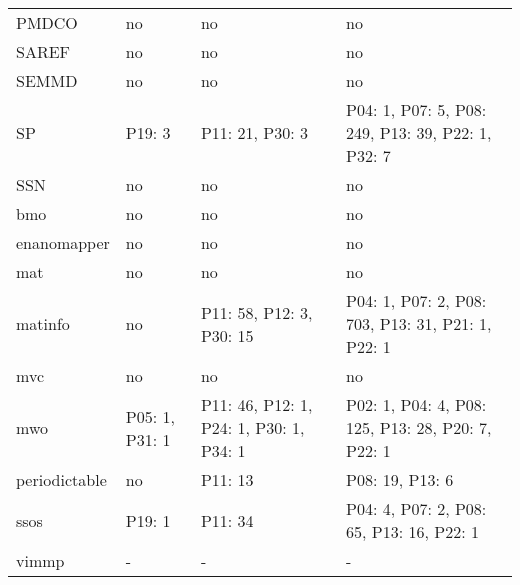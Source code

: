 \begin{tabular}{m{5cm}m{3cm}m{3cm}m{3cm}}
                  PMDCO &                      no &                                      no &                                                no \\
                  SAREF &                      no &                                      no &                                                no \\
                  SEMMD &                      no &                                      no &                                                no \\
                     SP &                  P19: 3 &                         P11: 21, P30: 3 & P04: 1, P07: 5, P08: 249, P13: 39, P22: 1, P32: 7 \\
                    SSN &                      no &                                      no &                                                no \\
                    bmo &                      no &                                      no &                                                no \\
            enanomapper &                      no &                                      no &                                                no \\
                    mat &                      no &                                      no &                                                no \\
                matinfo &                      no &                P11: 58, P12: 3, P30: 15 & P04: 1, P07: 2, P08: 703, P13: 31, P21: 1, P22: 1 \\
                    mvc &                      no &                                      no &                                                no \\
                    mwo &          P05: 1, P31: 1 & P11: 46, P12: 1, P24: 1, P30: 1, P34: 1 & P02: 1, P04: 4, P08: 125, P13: 28, P20: 7, P22: 1 \\
          periodictable &                      no &                                 P11: 13 &                                   P08: 19, P13: 6 \\
                   ssos &                  P19: 1 &                                 P11: 34 &          P04: 4, P07: 2, P08: 65, P13: 16, P22: 1 \\
                  vimmp &                       - &                                       - &                                                 - \\
\bottomrule
\end{tabular}
